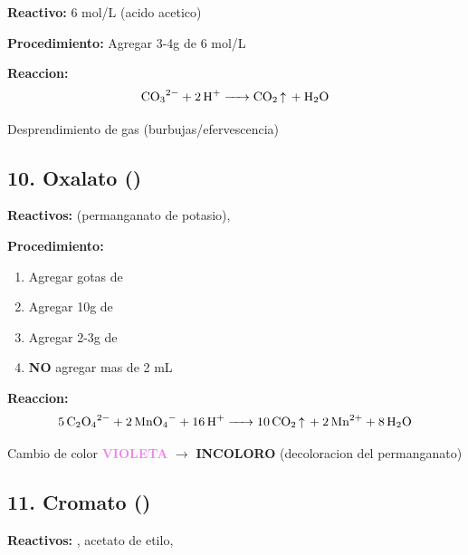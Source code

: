 \documentclass[11pt,a4paper]{article}
\begin{document}
\textbf{Reactivo:}  6 mol/L (acido acetico)

\textbf{Procedimiento:} Agregar 3-4g de  6 mol/L

\begin{reaccionbox}
\textbf{Reaccion:}
\begin{equation*}
\ce{CO3^{2-} + 2H^+ -> CO2 ^ + H2O}
\end{equation*}
\end{reaccionbox}

\begin{resultado}
Desprendimiento de gas  (burbujas/efervescencia)
\end{resultado}

\subsection{10. Oxalato ()}

\textbf{Reactivos:}  (permanganato de potasio), 

\textbf{Procedimiento:}
\begin{enumerate}[leftmargin=*]
    \item Agregar gotas de 
    \item Agregar 10g de 
    \item Agregar 2-3g de 
    \item \textbf{NO} agregar mas de 2 mL
\end{enumerate}

\begin{reaccionbox}
\textbf{Reaccion:}
\begin{equation*}
\ce{5C2O4^{2-} + 2MnO4^- + 16H^+ -> 10CO2 ^ + 2Mn^{2+} + 8H2O}
\end{equation*}
\end{reaccionbox}

\begin{resultado}
Cambio de color \textbf{\textcolor{violet}{VIOLETA}} $\rightarrow$ \textbf{INCOLORO} (decoloracion del permanganato)
\end{resultado}

\subsection{11. Cromato ()}

\textbf{Reactivos:} , acetato de etilo, 
\end{document}
